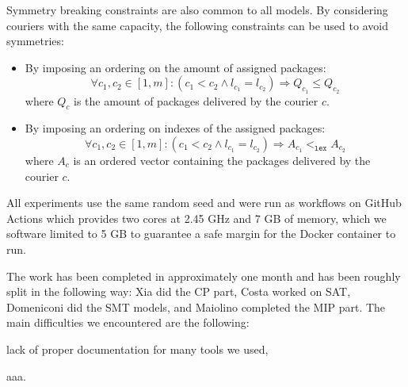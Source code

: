 \documentclass{article}
\begin{document}
    Symmetry breaking constraints are also common to all models. By considering couriers with the same capacity, the following constraints can be used to avoid symmetries:
    \begin{itemize}
        \item By imposing an ordering on the amount of assigned packages:
            \begin{equation}
                \label{eq:cp_symm_amount}
                \forall c_1, c_2 \in [1, m]: (c_1 < c_2 \land l_{c_1} = l_{c_2}) \Rightarrow Q_{c_1} \leq Q_{c_2}
            \end{equation}
            where $Q_c$ is the amount of packages delivered by the courier $c$.
        \item By imposing an ordering on indexes of the assigned packages:
            \begin{equation}
                \label{eq:cp_symm_packs}
                \forall c_1, c_2 \in [1, m]: (c_1 < c_2 \land l_{c_1} = l_{c_2}) \Rightarrow A_{c_1} <_\texttt{lex} A_{c_2}
            \end{equation}
            where $A_c$ is an ordered vector containing the packages delivered by the courier $c$.
    \end{itemize}

    All experiments use the same random seed and were run as workflows on GitHub Actions which provides two cores at 2.45 GHz and 7 GB of memory, which we software limited to 5 GB to guarantee a safe margin for the Docker container to run.

    The work has been completed in approximately one month and has been roughly split in the following way: Xia did the CP part, Costa worked on SAT, Domeniconi did the SMT models, and Maiolino completed the MIP part. The main difficulties we encountered are the following: 
    \begin{enumerate*}[label=(\roman*)]
        \item lack of proper documentation for many tools we used,
        \item aaa.
    \end{enumerate*}


    
    
    
    

    \printbibliography
\end{document}
